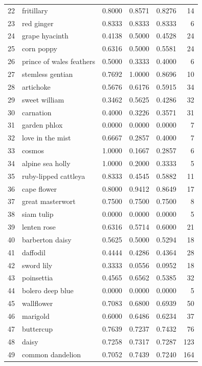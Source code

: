 \begin{longtable}{rlrrrr}
22 & fritillary & 0.8000 & 0.8571 & 0.8276 & 14 \\
23 & red ginger & 0.8333 & 0.8333 & 0.8333 & 6 \\
24 & grape hyacinth & 0.4138 & 0.5000 & 0.4528 & 24 \\
25 & corn poppy & 0.6316 & 0.5000 & 0.5581 & 24 \\
26 & prince of wales feathers & 0.5000 & 0.3333 & 0.4000 & 6 \\
27 & stemless gentian & 0.7692 & 1.0000 & 0.8696 & 10 \\
28 & artichoke & 0.5676 & 0.6176 & 0.5915 & 34 \\
29 & sweet william & 0.3462 & 0.5625 & 0.4286 & 32 \\
30 & carnation & 0.4000 & 0.3226 & 0.3571 & 31 \\
31 & garden phlox & 0.0000 & 0.0000 & 0.0000 & 7 \\
32 & love in the mist & 0.6667 & 0.2857 & 0.4000 & 7 \\
33 & cosmos & 1.0000 & 0.1667 & 0.2857 & 6 \\
34 & alpine sea holly & 1.0000 & 0.2000 & 0.3333 & 5 \\
35 & ruby-lipped cattleya & 0.8333 & 0.4545 & 0.5882 & 11 \\
36 & cape flower & 0.8000 & 0.9412 & 0.8649 & 17 \\
37 & great masterwort & 0.7500 & 0.7500 & 0.7500 & 8 \\
38 & siam tulip & 0.0000 & 0.0000 & 0.0000 & 5 \\
39 & lenten rose & 0.6316 & 0.5714 & 0.6000 & 21 \\
40 & barberton daisy & 0.5625 & 0.5000 & 0.5294 & 18 \\
41 & daffodil & 0.4444 & 0.4286 & 0.4364 & 28 \\
42 & sword lily & 0.3333 & 0.0556 & 0.0952 & 18 \\
43 & poinsettia & 0.4565 & 0.6562 & 0.5385 & 32 \\
44 & bolero deep blue & 0.0000 & 0.0000 & 0.0000 & 5 \\
45 & wallflower & 0.7083 & 0.6800 & 0.6939 & 50 \\
46 & marigold & 0.6000 & 0.6486 & 0.6234 & 37 \\
47 & buttercup & 0.7639 & 0.7237 & 0.7432 & 76 \\
48 & daisy & 0.7258 & 0.7317 & 0.7287 & 123 \\
49 & common dandelion & 0.7052 & 0.7439 & 0.7240 & 164 \\

\end{longtable}
